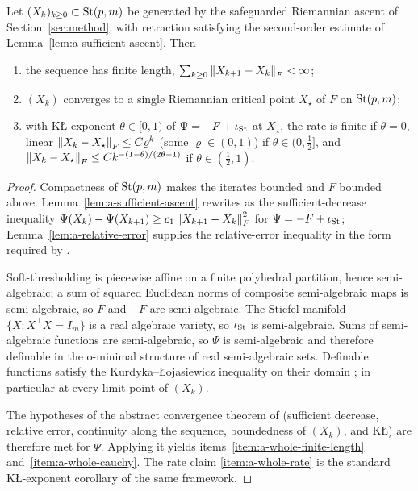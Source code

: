 \begin{theorem}
\label{thm:a-whole-sequence}
Let $(X_k)_{k\ge0}\subset\mathrm{St}(p,m)$ be generated by the safeguarded Riemannian ascent of Section~\ref{sec:method}, with retraction satisfying the second-order estimate of Lemma~\ref{lem:a-sufficient-ascent}. Then
\begin{enumerate}
\item\label{item:a-whole-finite-length} the sequence has finite length, $\sum_{k\ge0}\left\lVert X_{k+1}-X_k \right\rVert_F<\infty$;
\item\label{item:a-whole-cauchy} $(X_k)$ converges to a single Riemannian critical point $X_\star$ of $F$ on $\mathrm{St}(p,m)$;
\item\label{item:a-whole-rate} with K\L{} exponent $\theta\in[0,1)$ of $\Psi=-F+\iota_{\mathrm{St}}$ at $X_\star$, the rate is finite if $\theta=0$, linear $\left\lVert X_k-X_\star \right\rVert_F\le C\varrho^k$ (some $\varrho\in(0,1)$) if $\theta\in(0,\tfrac12]$, and $\left\lVert X_k-X_\star \right\rVert_F\le C k^{-(1-\theta)/(2\theta-1)}$ if $\theta\in(\tfrac12,1)$.
\end{enumerate}
\end{theorem}
\begin{proof}
Compactness of $\mathrm{St}(p,m)$ makes the iterates bounded and $F$ bounded above. Lemma~\ref{lem:a-sufficient-ascent} rewrites as the sufficient-decrease inequality $\Psi(X_k)-\Psi(X_{k+1})\ge c_1\left\lVert X_{k+1}-X_k \right\rVert_F^2$ for $\Psi=-F+\iota_{\mathrm{St}}$; Lemma~\ref{lem:a-relative-error} supplies the relative-error inequality in the form required by \citet{attouch2013convergence}.

Soft-thresholding is piecewise affine on a finite polyhedral partition, hence semi-algebraic; a sum of squared Euclidean norms of composite semi-algebraic maps is semi-algebraic, so $F$ and $-F$ are semi-algebraic. The Stiefel manifold $\{X:X^\top X=I_m\}$ is a real algebraic variety, so $\iota_{\mathrm{St}}$ is semi-algebraic. Sums of semi-algebraic functions are semi-algebraic, so $\Psi$ is semi-algebraic and therefore definable in the o-minimal structure of real semi-algebraic sets. Definable functions satisfy the Kurdyka--\L{}ojasiewicz inequality on their domain \citep{bolte2007lojasiewicz}; in particular at every limit point of $(X_k)$.

The hypotheses of the abstract convergence theorem of \citet{attouch2013convergence} (sufficient decrease, relative error, continuity along the sequence, boundedness of $(X_k)$, and K\L) are therefore met for $\Psi$. Applying it yields items~\ref{item:a-whole-finite-length} and~\ref{item:a-whole-cauchy}. The rate claim \ref{item:a-whole-rate} is the standard K\L-exponent corollary of the same framework.
\end{proof}

